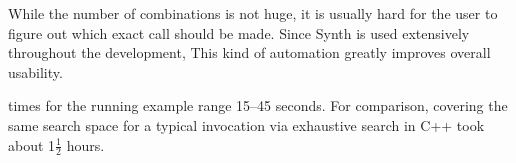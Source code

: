 While the number of combinations is not huge, 
it is usually hard for the user to figure out which exact call
should be made. Since {\sf Synth} is used extensively throughout the development,
This kind of automation greatly improves overall usability.

{\Sketch} times for the running example range 15--45 seconds.
For comparison, covering the same search space for a typical invocation via exhaustive search in C++ took about 1$\frac{1}{2}$ hours.

\begin{comment}

\subsection{Soundness}
\label{tactics:soundness}

\renewenvironment{proof}{\noindent{\bf Proof.~}}{}

\begin{theorem}
Let $s=s'$ be an instance of one of the tactics introduced in this section.
let $a_i=b_i$, $i=1..k$, be the proof obligations. If $\semp{a_i}=\semp{b_i}$
for all interpretations of the free variables of $a_i$ and $b_i$, then
$\semp{s}=\semp{s'}$ for all interpretations of the free variables of $s$ and $s'$.
\end{theorem}

\begin{proof}
For the tactics with \textbf{\textit{Obligations}:} tactic, the theorem is trivial.

\medskip
\noindent
{\tt >} For {\sf Stratify}, let $f$, $g$ be partial functions such that
\vspace{-.5em}
\[\renewcommand\arraystretch{1.3}
  \forall \theta,\zeta.\quad \begin{array}{l}f\,(g\,\zeta\,\theta) ~=~ f\,\zeta \quad\land\quad
  g\,(f\,\theta)\,\theta ~=~ h\,\theta
  \end{array}\quad\]
  
Assume that $\zeta = \fix f$ and $\theta = \fix (g\,\zeta)$. 
That is, $f\,\zeta = \zeta$ and $g\,\zeta\,\theta = \theta$.
Then ---
\vspace{-.5em}
\[\renewcommand\arraystretch{1.3}
  \begin{array}{l@{}l}
   h\,\theta & {}= g\,(f\,\theta)\,\theta = g\,(f\,(g\,\zeta\,\theta))\,\theta =
              g\,(f\,\zeta)\,\theta = \theta
  \end{array}\]
  

\end{comment}
